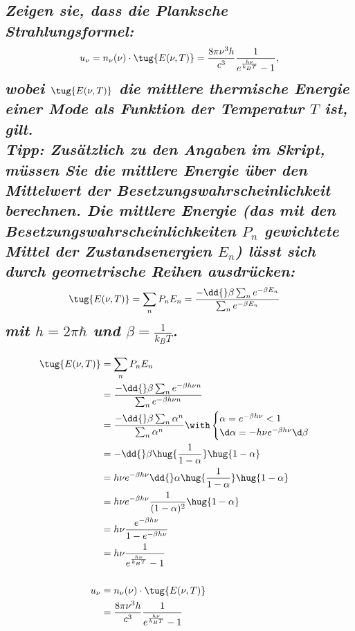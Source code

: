 \documentclass[ex,minted]{exercise_4.0}
\begin{document}
\subsection{\it Zeigen sie, dass die Planksche Strahlungsformel:
\begin{align*}
    u_\nu = n_\nu (\nu) \cdot \tug{E(\nu,T)} = \frac{8\pi \nu^3 h}{c^3}\frac{1}{e^{\frac{h\nu}{k_B T}}-1},
\end{align*}
wobei \(\tug{E(\nu,T)}\) die mittlere thermische Energie einer Mode als Funktion der Temperatur \(T\) ist, gilt.\\
Tipp: Zusätzlich zu den Angaben im Skript, müssen Sie die mittlere Energie über den Mittelwert der Besetzungswahrscheinlichkeit berechnen. Die mittlere Energie (das mit den Besetzungswahrscheinlichkeiten \(P_n\) gewichtete Mittel der Zustandsenergien \(E_n\)) lässt sich durch geometrische Reihen ausdrücken:
\begin{align*}
    \tug{E(\nu,T)} &= \sum_n P_n E_n = \frac{-\dd{}\beta \sum_n e^{-\beta E_n}}{\sum_n e^{-\beta E_n}}
\end{align*}
mit \(h=2\pi\hbar\) und \(\beta= \frac{1}{k_B T}\).
}

\dottedlinete

\begin{align*}    
    \tug{E(\nu,T)} &= \sum_n P_n E_n \\
    &= \frac{-\dd{}\beta \sum_n e^{-\beta h \nu n}}{\sum_n e^{-\beta h \nu n}}\\
    &= \frac{-\dd{}\beta \sum_n \alpha^n}{\sum_n \alpha^n}\with\begin{cases}
        \alpha = e^{-\beta h \nu }<1\\
        \d\alpha = -h\nu e^{-\beta h \nu } \d\beta
    \end{cases}\\
    &= - \dd{}\beta \hug{\frac{1}{1-\alpha}}\hug{1-\alpha}\\
    &=  h\nu e^{-\beta h \nu}\dd{}\alpha \hug{\frac{1}{1-\alpha}}\hug{1-\alpha}\\
    &= h\nu e^{-\beta h \nu}\frac{1}{(1-\alpha)^2}\hug{1-\alpha}\\
    &= h\nu \frac{e^{-\beta h \nu}}{1-e^{-\beta h \nu}}\\
    &= h\nu \frac{1}{e^{\frac{h \nu}{k_B T}}-1}\\
    \\
    u_\nu &= n_\nu(\nu)\cdot \tug{E(\nu, T)} \\
    &=   \frac{8\pi \nu^3 h}{c^3}\frac{1}{e^{\frac{h\nu}{k_B T}}-1}
\end{align*}
\end{document}
